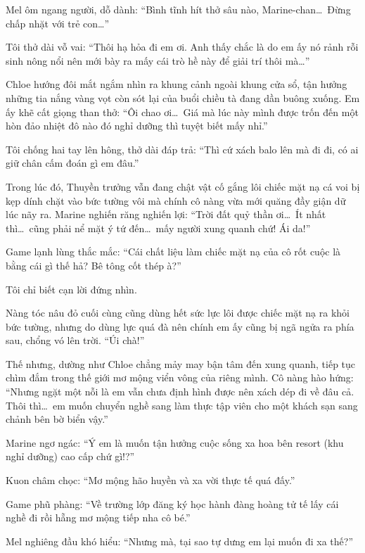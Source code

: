 \documentclass[../main.tex]{subfiles}
\begin{document}
Mel ôm ngang người, dỗ dành: ``Bình tĩnh hít thở sâu nào, Marine-chan\dots\ Đừng chấp nhặt với trẻ con\dots''

Tôi thở dài vỗ vai: ``Thôi hạ hỏa đi em ơi. Anh thấy chắc là do em ấy nó rảnh rỗi sinh nông nổi nên mới bày ra mấy cái trò hề này để giải trí thôi mà\dots''

\ct

Chloe hướng đôi mắt ngắm nhìn ra khung cảnh ngoài khung cửa sổ, tận hưởng những tia nắng vàng vọt còn sót lại của buổi chiều tà đang dần buông xuống. Em ấy khẽ cất giọng than thở: ``Ôi chao ơi\dots\ Giá mà lúc này mình được trốn đến một hòn đảo nhiệt đô nào đó nghỉ dưỡng thì tuyệt biết mấy nhỉ.''

Tôi chống hai tay lên hông, thở dài đáp trả: ``Thì cứ xách balo lên mà đi đi, có ai giữ chân cấm đoán gì em đâu.''

Trong lúc đó, Thuyền trưởng vẫn đang chật vật cố gắng lôi chiếc mặt nạ cá voi bị kẹp dính chặt vào bức tường vôi mà chính cô nàng vừa mới quăng đầy giận dữ lúc nãy ra. Marine nghiến răng nghiến lợi: ``Trời đất quỷ thần ơi\dots\ Ít nhất thì\dots\ cũng phải nể mặt ý tứ đến\dots\ mấy người xung quanh chứ! Ái da!''


Game lạnh lùng thắc mắc: ``Cái chất liệu làm chiếc mặt nạ của cô rốt cuộc là bằng cái gì thế hả? Bê tông cốt thép à?''

Tôi chỉ biết cạn lời đứng nhìn.

Nàng tóc nâu đỏ cuối cùng cũng dùng hết sức lực lôi được chiếc mặt nạ ra khỏi bức tường, nhưng do dùng lực quá đà nên chính em ấy cũng bị ngã ngửa ra phía sau, chổng vó lên trời. ``Úi chà!''

Thế nhưng, dường như Chloe chẳng mảy may bận tâm đến xung quanh, tiếp tục chìm đắm trong thế giới mơ mộng viển vông của riêng mình. Cô nàng hào hứng: ``Nhưng ngặt một nỗi là em vẫn chưa định hình được nên xách dép đi về đâu cả. Thôi thì\dots\ em muốn chuyển nghề sang làm thực tập viên cho một khách sạn sang chảnh bên bờ biển vậy.''

Marine ngơ ngác: ``Ý em là muốn tận hưởng cuộc sống xa hoa bên resort (khu nghỉ dưỡng) cao cấp chứ gì!?''

Kuon châm chọc: ``Mơ mộng hão huyền và xa vời thực tế quá đấy.''

Game phũ phàng: ``Về trường lớp đăng ký học hành đàng hoàng tử tế lấy cái nghề đi rồi hẵng mơ mộng tiếp nha cô bé.''

Mel nghiêng đầu khó hiểu: ``Nhưng mà, tại sao tự dưng em lại muốn đi xa thế?''
\end{document}
